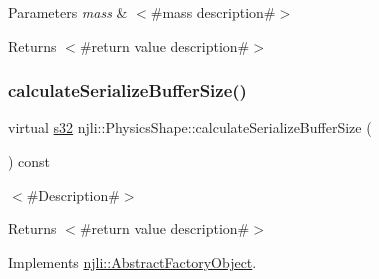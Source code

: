 \begin{DoxyParams}{Parameters}
{\em mass} & $<$\#mass description\#$>$\\
\hline
\end{DoxyParams}
\begin{DoxyReturn}{Returns}
$<$\#return value description\#$>$ 
\end{DoxyReturn}
\mbox{\label{classnjli_1_1_physics_shape_a0612a1c8c3f4520d78cb7f5838f03074}} 
\subsubsection{\texorpdfstring{calculate\+Serialize\+Buffer\+Size()}{calculateSerializeBufferSize()}}
{\footnotesize\ttfamily virtual \mbox{\hyperlink{_util_8h_aa62c75d314a0d1f37f79c4b73b2292e2}{s32}} njli\+::\+Physics\+Shape\+::calculate\+Serialize\+Buffer\+Size (\begin{DoxyParamCaption}{ }\end{DoxyParamCaption}) const\hspace{0.3cm}{\ttfamily [pure virtual]}}

$<$\#\+Description\#$>$

\begin{DoxyReturn}{Returns}
$<$\#return value description\#$>$ 
\end{DoxyReturn}


Implements \mbox{\hyperlink{classnjli_1_1_abstract_factory_object_a4763d05bc9dc37c559111f8bb30e1dd8}{njli\+::\+Abstract\+Factory\+Object}}.



